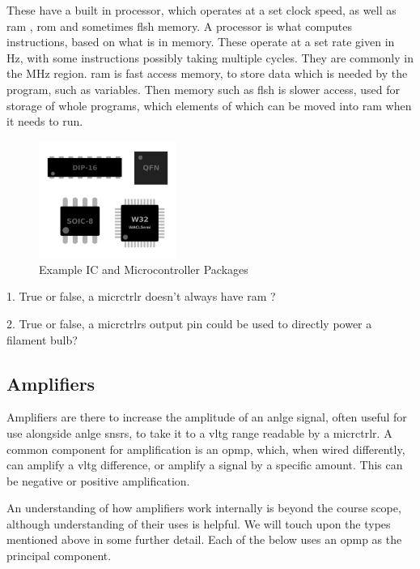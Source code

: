 \documentclass[a4paper,11pt]{report}
\newcommand{\Quiz}[1] %
{
\par\noindent %
\phantomsection %
\todo[inline, color=blue!30]{\textbf{#1}} %
\vspace{1em} %
}
\begin{document}
These have a built in processor, which operates at a set clock speed, as well as \gls{ram} , \gls{rom}  and sometimes  \gls{flsh}  memory. A processor is what computes instructions, based on what is in memory. These operate at a set rate given in Hz, with some instructions possibly taking multiple cycles. They are commonly in the MHz region. \gls{ram} is fast access memory, to store data which is needed by the program, such as variables. Then memory such as  \gls{flsh}  is slower access, used for storage of whole programs, which elements of which can be moved into \gls{ram} when it needs to run.

\begin{figure}[H]
\centering
\includegraphics[width=0.4\textwidth]{icpackages}
\caption{Example IC and Microcontroller Packages}
\end{figure}

\Quiz{Quiz}

1. True or false, a \gls{micrctrlr} doesn't always have \gls{ram} ?

2. True or false, a \gls{micrctrlr}s output pin could be used to directly power a filament bulb?

\vspace*{1\baselineskip}

\subsection{Amplifiers}

Amplifiers are there to increase the amplitude of an \gls{anlge} signal, often useful for use alongside \gls{anlge} \gls{snsr}s, to take it to a \gls{vltg} range readable by a \gls{micrctrlr}. A common component for amplification is an \gls{opmp}, which, when wired differently, can amplify a \gls{vltg} difference, or amplify a signal by a specific amount. This can be negative or positive amplification.

An understanding of how amplifiers work internally is beyond the course scope, although understanding of their uses is helpful. We will touch upon the types mentioned above in some further detail. Each of the below uses an \gls{opmp} as the principal component.
\end{document}

